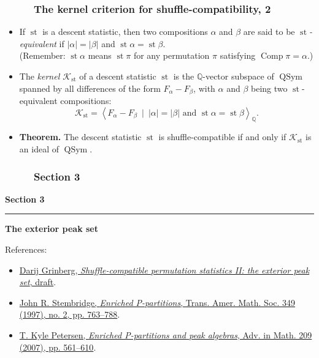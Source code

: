 \documentclass{beamer}
\newcommand{\red}{\color{red}}
\newcommand{\QQ}{{\mathbb Q}}
\newcommand{\Comp}{\operatorname{Comp}}
\newcommand{\st}{\operatorname{st}}
\newcommand{\QSym}{\operatorname{QSym}}
\newcommand{\calK}{\mathcal{K}}
\newcommand{\fti}[1]{\frametitle{\ \ \ \ \ #1}}
\newcommand{\abs}[1]{\left| #1 \right|}
\newcommand{\defn}[1]{{\color{darkred}\emph{#1}}} %
\theoremstyle{plain}
\begin{document}
\begin{frame}
\fti{The kernel criterion for shuffle-compatibility, 2}

\begin{itemize}

\item If $\st$ is a descent statistic, then two compositions
      $\alpha$ and $\beta$ are said to be \defn{$\st$-equivalent}
      if $\abs{\alpha} = \abs{\beta}$ and $\st\alpha = \st\beta$.
      \\ (Remember: $\st\alpha$ means $\st\pi$ for any permutation
      $\pi$ satisfying $\Comp\pi = \alpha$.)

\pause

\item The \defn{kernel $\calK_{\st}$} of a descent statistic $\st$
      is the $\QQ$-vector subspace of $\QSym$ spanned by all
      differences of the form $F_\alpha - F_\beta$, with $\alpha$
      and $\beta$ being two $\st$-equivalent compositions:
      \[
      \calK_{\st} = \left< F_\alpha - F_\beta \ 
                              \mid \ \abs{\alpha} = \abs{\beta} \text{ and }
                                   \st \alpha = \st \beta \right>_\QQ .
      \]

\pause

\item \textbf{Theorem.} The descent statistic $\st$ is
      shuffle-compatible if and only if $\calK_{\st}$ is an
      ideal of $\QSym$.

\end{itemize}

\end{frame}

\begin{frame}
\fti{Section 3}
\begin{center}
{\LARGE \bf Section 3} \\
\noindent\rule[0.5ex]{\linewidth}{1pt}
{\Large \bf The exterior peak set}
\end{center}
\vspace{1cm}
References:
\begin{itemize}
\item \href{https://github.com/darijgr/gzshuf}{\red Darij Grinberg, \textit{Shuffle-compatible permutation statistics II: the exterior peak set}, draft}.
\item \href{http://www.ams.org/journals/tran/1997-349-02/S0002-9947-97-01804-7/}{\red John R. Stembridge, \textit{Enriched P-partitions}, Trans. Amer. Math. Soc. 349 (1997), no. 2, pp. 763--788}.
\item \href{https://doi.org/10.1016/j.aim.2006.05.0160}{\red T. Kyle Petersen, \textit{Enriched P-partitions and peak algebras}, Adv. in Math. 209 (2007), pp. 561--610}.
\end{itemize}
\end{frame}
\end{document}
